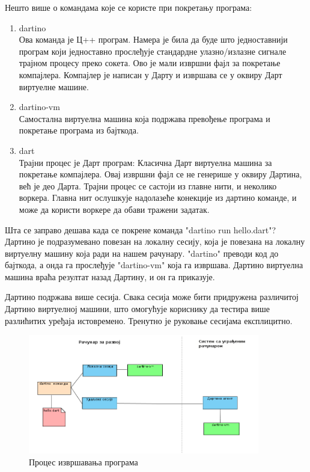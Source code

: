 \documentclass[12pt,oneside]{memoir}
\begin{document}
Нешто више о командама које се користе при покретању програма:
\begin{enumerate}
\item dartino\\
Ова команда је Ц++ програм. Намера је била да буде што једноставнији програм који једноставно прослеђује стандардне улазно/излазне сигнале трајном процесу преко сокета. Ово је мали извршни фајл за покретање компајлера. Компајлер је написан у Дарту и извршава се у оквиру Дарт виртуелне машине. 
\item dartino-vm \\
Самостална виртуелна машина која подржава превођење програма и покретање програма из бајткода.
\item dart \\
Трајни процес је Дарт програм: Класична Дарт виртуелна машина за покретање компајлера. Овај извршни фајл се не генерише у оквиру Дартина, већ је део Дарта. Трајни процес се састоји из главне нити, и неколико воркера. Главна нит ослушкује надолазеће конекције из дартино команде, и може да користи воркере да обави тражени задатак.
\end{enumerate}

Шта се заправо дешава када се покрене команда "dartino run hello.dart"? Дартино је подразумевано повезан на локалну сесију, која је повезана на локалну виртуелну машину која ради на нашем рачунару. "dartino" преводи код до бајткода, а онда га прослеђује "dartino-vm" која га извршава. Дартино виртуелна машина враћа резултат назад Дартину, и он га приказује.

Дартино подржава више сесија. Свака сесија може бити придружена различитој Дартино виртуелној машини, што омогућује кориснику да тестира више разлићитих уређаја истовремено. Тренутно је руковање сесијама експлицитно.

\begin{figure}[!ht]
  \centering
  \includegraphics[width=0.9\textwidth]{sesije.png}
  \caption{Процес извршавања програма}
  \label{fig:izvrsavanje}
\end{figure}
\end{document}
